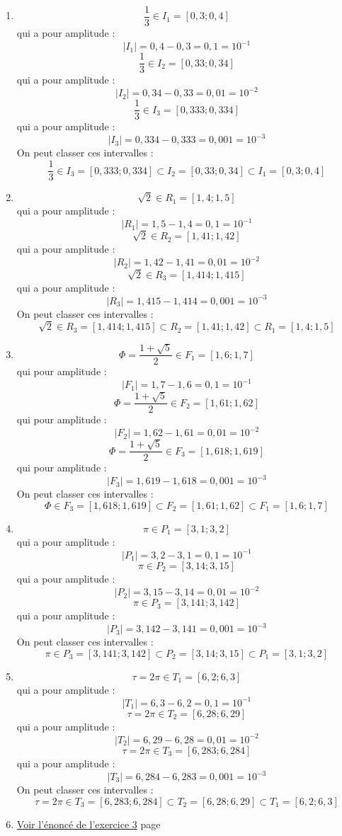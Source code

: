 \documentclass[a4paper,11pt]{book}
\begin{document}
\begin{enumerate}
\item \[\dfrac{1}{3}\in I_1 = [0,3 ; 0,4]\]
qui a pour amplitude :
\[|I_1| = 0,4 - 0,3 = 0,1 = 10^{-1}\]
\[\dfrac{1}{3}\in I_2 = [0,33 ; 0,34]\]
qui a pour amplitude :
\[|I_2| = 0,34 - 0,33 = 0,01 = 10^{-2}\]
\[\dfrac{1}{3}\in I_3 = [0,333 ; 0,334]\]
qui a pour amplitude :
\[|I_3| = 0,334 - 0,333 = 0,001 = 10^{-3}\]
On peut classer ces intervalles :
\[\dfrac{1}{3}\in I_3 = [0,333 ; 0,334] \subset I_2 = [0,33 ;
   0,34] \subset I_1 = [0,3 ; 0,4]\]
\item \[\sqrt{2}\in R_1 = [1,4 ; 1,5]\]
qui a pour amplitude :
\[|R_1| = 1,5 - 1,4 = 0,1 = 10^{-1}\]
\[\sqrt{2}\in R_2 = [1,41 ; 1,42]\]
qui a pour amplitude :
\[|R_2| = 1,42 - 1,41 = 0,01 = 10^{-2}\]
\[\sqrt{2}\in R_3 = [1,414 ; 1,415]\]
qui a pour amplitude :
\[|R_3| = 1,415 - 1,414 = 0,001 = 10^{-3}\]
On peut classer ces intervalles :
\[\sqrt{2}\in R_3 = [1,414 ; 1,415] \subset R_2 = [1,41 ;
   1,42]\subset R_1 = [1,4 ; 1,5]\]
\item \[\Phi = \dfrac{1 + \sqrt{5}}{2}\in F_1 = [1,6 ; 1,7]\]
qui pour amplitude :
\[|F_1| = 1,7 - 1,6 = 0,1 = 10^{-1}\]
\[\Phi = \dfrac{1 + \sqrt{5}}{2}\in F_2 = [1,61 ; 1,62]\]
qui pour amplitude :
\[|F_2| = 1,62 - 1,61 = 0,01 = 10^{-2}\]
\[\Phi = \dfrac{1 + \sqrt{5}}{2}\in F_3 = [1,618 ; 1,619]\]
qui pour amplitude :
\[|F_3| = 1,619 - 1,618 = 0,001 = 10^{-3}\]
On peut classer ces intervalles :
\[\Phi\in F_3 = [1,618 ; 1,619] \subset F_2 = [1,61 ; 1,62]\subset
   F_1 = [1,6 ; 1,7]\]
\item \[\pi\in P_1 = [3,1 ; 3,2]\]
qui a pour amplitude :
\[|P_1| = 3,2 - 3,1 = 0,1 = 10^{-1}\]
\[\pi\in P_2 = [3,14 ; 3,15]\]
qui a pour amplitude :
\[|P_2| = 3,15 - 3,14 = 0,01 = 10^{-2}\]
\[\pi\in P_3 = [3,141 ; 3,142]\]
qui a pour amplitude :
\[|P_3| = 3,142 - 3,141 = 0,001 = 10^{-3}\]
On peut classer ces intervalles :
\[\pi\in P_3 = [3,141 ; 3,142]\subset P_2 = [3,14 ; 3,15]\subset P_1 = [3,1 ;
   3,2]\]
\item \[\tau = 2\pi\in T_1 = [6,2 ; 6,3]\]
qui a pour amplitude :
\[|T_1| = 6,3 - 6,2 = 0,1 = 10^{-1}\]
\[\tau = 2\pi\in T_2 = [6,28 ; 6,29]\]
qui a pour amplitude :
\[|T_2| = 6,29 - 6,28 = 0,01 = 10^{-2}\]
\[\tau = 2\pi\in T_3 = [6,283 ; 6,284]\]
qui a pour amplitude :
\[|T_3| = 6,284 - 6,283 = 0,001 = 10^{-3}\]
On peut classer ces intervalles :
\[\tau = 2\pi\in T_3 = [6,283 ; 6,284]\subset T_2 = [6,28 ;
   6,29]\subset T_1 = [6,2 ; 6,3]\]

\item \hyperref[org61fbd6f]{Voir l'énoncé de l'exercice 3}
page~\pageref{page:sec2.2.2exo3}
\end{enumerate}
\end{document}
